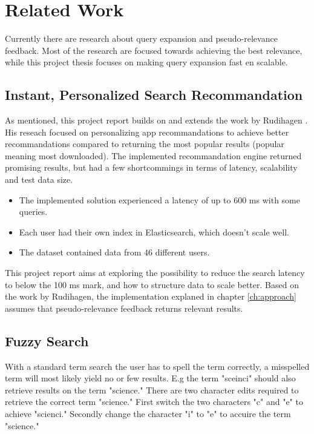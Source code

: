 \chapter{Related Work}
\label{ch:related-work}
Currently there are research about query expansion and pseudo-relevance feedback.
Most of the research are focused towards achieving the best relevance,
while this project thesis focuses on making query expansion fast en scalable.

\section{Instant, Personalized Search Recommandation}
As mentioned, this project report builds on and extends the work by Rudihagen \cite{master-thesis}.
His reseach focused on personalizing app recommandations to achieve better recommandations compared to returning the most popular results (popular meaning most downloaded).
The implemented recommandation engine returned promising results, but had a few shortcommings in terms of latency, scalability and test data size.

\begin{itemize}
  \item The implemented solution experienced a latency of up to 600 ms with some queries.
  \item Each user had their own index in Elasticsearch, which doesn't scale well.
  \item The dataset contained data from 46 different users.
\end{itemize}

This project report aims at exploring the possibility to reduce the search latency to below the 100 ms mark, and how to structure data to scale better.
Based on the work by Rudihagen,
the implementation explaned in chapter \ref{ch:approach} assumes that pseudo-relevance feedback returns relevant results.

\section{Fuzzy Search}
With a standard term search the user has to spell the term correctly, a misspelled term will most likely yield no or few results.
E.g the term "sceinci" should also retrieve results on the term "science."
There are two character edits required to retrieve the correct term "science."
First switch the two characters "c" and "e" to achieve "scienci."
Secondly change the character "i" to "e" to accuire the term "science."

